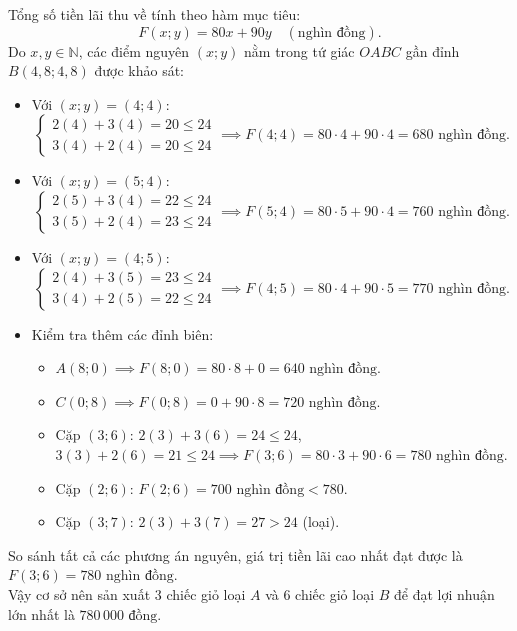 \begin{ex}
{\begin{center}
		\end{center}
		Tổng số tiền lãi thu về tính theo hàm mục tiêu:
		\[
		F(x; y) = 80x + 90y \quad (\text{nghìn đồng}).
		\]
		Do $x, y \in \mathbb{N}$, các điểm nguyên $(x; y)$ nằm trong tứ giác $OABC$ gần đỉnh $B(4{,}8; 4{,}8)$ được khảo sát:
		\begin{itemize}
			\item Với $(x; y) = (4; 4)$:
			\[
			\begin{cases} 2(4) + 3(4) = 20 \le 24 \\ 3(4) + 2(4) = 20 \le 24 \end{cases} \implies F(4; 4) = 80\cdot 4 + 90\cdot 4 = 680 \text{ nghìn đồng}.
			\]
			\item Với $(x; y) = (5; 4)$:
			\[
			\begin{cases} 2(5) + 3(4) = 22 \le 24 \\ 3(5) + 2(4) = 23 \le 24 \end{cases} \implies F(5; 4) = 80\cdot 5 + 90\cdot 4 = 760 \text{ nghìn đồng}.
			\]
			\item Với $(x; y) = (4; 5)$:
			\[
			\begin{cases} 2(4) + 3(5) = 23 \le 24 \\ 3(4) + 2(5) = 22 \le 24 \end{cases} \implies F(4; 5) = 80\cdot 4 + 90\cdot 5 = 770 \text{ nghìn đồng}.
			\]
			\item Kiểm tra thêm các đỉnh biên:
			\begin{itemize}
				\item $A(8; 0) \implies F(8; 0) = 80 \cdot 8 + 0 = 640\text{ nghìn đồng}$.
				\item $C(0; 8) \implies F(0; 8) = 0 + 90 \cdot 8 = 720\text{ nghìn đồng}$.
				\item Cặp $(3; 6)$: $2(3) + 3(6) = 24 \le 24$, $3(3) + 2(6) = 21 \le 24 \implies F(3; 6) = 80\cdot 3 + 90\cdot 6 = 780\text{ nghìn đồng}$.
				\item Cặp $(2; 6)$: $F(2; 6) = 700\text{ nghìn đồng} < 780$.
				\item Cặp $(3; 7)$: $2(3) + 3(7) = 27 > 24$ (loại).
			\end{itemize}
		\end{itemize}
		So sánh tất cả các phương án nguyên, giá trị tiền lãi cao nhất đạt được là $F(3; 6) = 780\text{ nghìn đồng}$.\\
		Vậy cơ sở nên sản xuất $3$ chiếc giỏ loại $A$ và $6$ chiếc giỏ loại $B$ để đạt lợi nhuận lớn nhất là $780\,000\text{ đồng}$.
	}
\end{ex}

